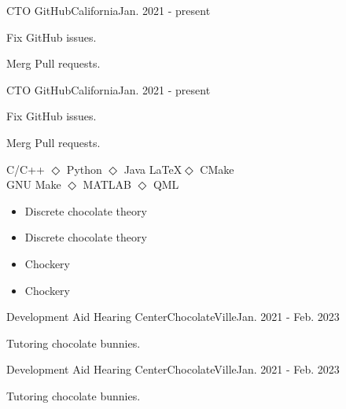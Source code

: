 \documentclass{resume}
\begin{document}
\makeheader
\makeeducation
{}

\makeexperience
\experienceentry
  {CTO}
  {GitHub}{California}{Jan. 2021 - present}
  {
    \item Fix GitHub issues.
    \item Merg Pull requests.
  }
\experienceentry
  {CTO}
  {GitHub}{California}{Jan. 2021 - present}
  {
    \item Fix GitHub issues.
    \item Merg Pull requests.
  }


\makeprogramming

\begin{center}
  C/C++ $\Diamond$ Python $\Diamond$ Java \LaTeX $\Diamond$ CMake \\
  GNU Make $\Diamond$ MATLAB $\Diamond$ QML
\end{center}

\makeconcecpts
\begin{multicols}{2}
    \begin{itemize}
        \item Discrete chocolate theory 
        \item Discrete chocolate theory 
        \item Chockery
        \item Chockery
    \end{itemize}
    \end{multicols}
\makevolunteer

\experienceentry
  {Development Aid}
  {Hearing Center}{ChocolateVille}{Jan. 2021 - Feb. 2023}
  {
    \item Tutoring chocolate bunnies.
  }
\experienceentry
  {Development Aid}
  {Hearing Center}{ChocolateVille}{Jan. 2021 - Feb. 2023}
  {
    \item Tutoring chocolate bunnies.
  }
\end{document}
